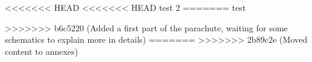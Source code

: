 <<<<<<< HEAD
<<<<<<< HEAD
test 2
=======
test


>>>>>>> b6c5220 (Added a first part of the parachute, waiting for some schematics to explain more in details)
=======
>>>>>>> 2b89c2e (Moved content to annexes)
